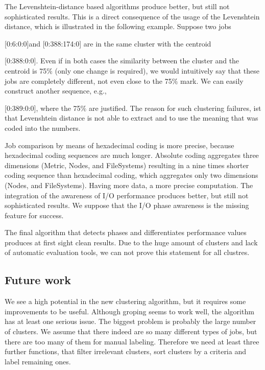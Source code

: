 \documentclass[]{llncs}
\begin{document}
{{{{The Levenshtein-distance based algorithms produce better, but still not sophisticated results.
This is a direct consequence of the usage of the Levenshtein distance, which is illustrated in the following example.
Suppose two jobs {[0:6:0:0]and [0:388:174:0] are in the same cluster with the centroid {[0:388:0:0].
Even if in both cases the similarity between the cluster and the centroid is 75$\%$  (only one change is required), we would intuitively say that these jobs are completely different, not even close to the 75$\%$  mark.
We can easily construct another sequence, e.g., {[0:389:0:0], where the 75$\%$  are justified.
The reason for such clustering failures, ist that Levenshtein distance is not able to extract and to use the meaning that was coded into the numbers.

Job comparison by means of hexadecimal coding is more precise, because hexadecimal coding sequences are much longer.
Absolute coding aggregates three dimensions (Metric, Nodes, and FileSystems) resulting in a nine times shorter coding sequence than hexadecimal coding, which aggregates only two dimensions (Nodes, and FileSystems).
Having more data, a more precise computation.
The integration of the awareness of I/O performance produces better, but still not sophisticated results.
We suppose that the I/O phase awareness is the missing feature for success.

The final algorithm that detects phases and differentiates performance values produces at first sight clean results.
Due to the huge amount of clusters and lack of automatic evaluation tools, we can not prove this statement for all clustres.

\subsection{Future work}
We see a high potential in the new clustering algorithm, but it requires some improvements to be useful.
Although groping seems to work well, the algorithm has at least one serious issue.
The biggest problem is probably the large number of clusters.
We assume that there indeed are so many different types of jobs, but there are too many of them for manual labeling.
Therefore we need at least three further functions, that filter irrelevant clusters, sort clusters by a criteria and label remaining ones.



}}}}}}}
\end{document}
